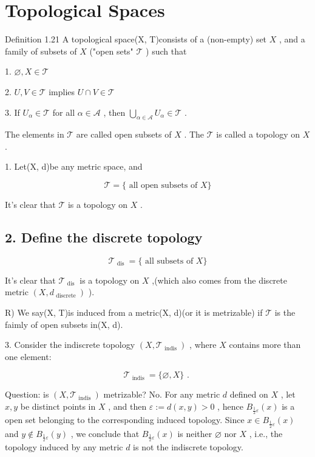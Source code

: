 
\chapter{Topological Spaces}

Definition 1.21 A topological space(X, T)consists of a (non-empty) set \(X\) , and a family of subsets of \(X\) ("open sets" \(\mathcal{T}\) ) such that

1. \(\varnothing ,X \in  \mathcal{T}\)

2. \(U,V \in  \mathcal{T}\) implies \(U \cap  V \in  \mathcal{T}\)

3. If \({U}_{\alpha } \in  \mathcal{T}\) for all \(\alpha  \in  \mathcal{A}\) , then \(\mathop{\bigcup }\limits_{{\alpha  \in  \mathcal{A}}}{U}_{\alpha } \in  \mathcal{T}\) .

The elements in \(\mathcal{T}\) are called open subsets of \(X\) . The \(\mathcal{T}\) is called a topology on \(X\) .

1. Let(X, d)be any metric space, and

\[
\mathcal{T} = \{ \text{ all open subsets of }X\}
\]

It’s clear that \(\mathcal{T}\) is a topology on \(X\) .

\section*{2. Define the discrete topology}

\[
{\mathcal{T}}_{\text{ dis }} = \{ \text{ all subsets of }X\}
\]

It’s clear that \({\mathcal{T}}_{\text{ dis }}\) is a topology on \(X\) ,(which also comes from the discrete metric \(\left( {X,{d}_{\text{ discrete }}}\right)\) ).

R) We say(X, T)is induced from a metric(X, d)(or it is metrizable) if \(\mathcal{T}\) is the faimly of open subsets in(X, d).

3. Consider the indiscrete topology \(\left( {X,{\mathcal{T}}_{\text{ indis }}}\right)\) , where \(X\) contains more than one element:

\[
{\mathcal{T}}_{\text{ indis }} = \{ \varnothing ,X\} \text{ . }
\]

Question: is \(\left( {X,{\mathcal{T}}_{\text{ indis }}}\right)\) metrizable? No. For any metric \(d\) defined on \(X\) , let \(x,y\) be distinct points in \(X\) , and then \(\varepsilon  \mathrel{\text{ := }} d\left( {x,y}\right)  > 0\) , hence \({B}_{\frac{1}{2}\varepsilon }\left( x\right)\) is a open set belonging to the corresponding induced topology. Since \(x \in  {B}_{\frac{1}{2}\varepsilon }\left( x\right)\) and \(y \notin  {B}_{\frac{1}{2}\varepsilon }\left( y\right)\) , we conclude that \({B}_{\frac{1}{2}\varepsilon }\left( x\right)\) is neither \(\varnothing\) nor \(X\) , i.e., the topology induced by any metric \(d\) is not the indiscrete topology.

